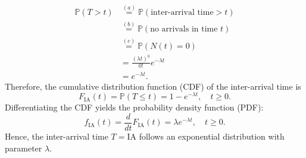 \documentclass[a4paper,12pt]{article}
\begin{document}
\begin{align*}
\mathbb{P}(T > t)
&\stackrel{(a)}{=} \mathbb{P}(\text{inter-arrival time} > t) \\
&\stackrel{(b)}{=} \mathbb{P}(\text{no arrivals in time } t) \\
&\stackrel{(c)}{=} \mathbb{P}(N(t) = 0) \\
&= \frac{(\lambda t)^0}{0!} e^{-\lambda t} \\
&= e^{-\lambda t}.
\end{align*}
\noindent
Therefore, the cumulative distribution function (CDF) of the inter-arrival time is
\[
F_{\text{IA}}(t) = \mathbb{P}(T \le t) = 1 - e^{-\lambda t}, \quad t \ge 0.
\]
\noindent
Differentiating the CDF yields the probability density function (PDF):
\[
f_{\text{IA}}(t) = \frac{d}{dt}F_{\text{IA}}(t) = \lambda e^{-\lambda t}, \quad t \ge 0.
\]
\noindent
Hence, the inter-arrival time $T = {\text{IA}}$ follows an exponential distribution with parameter $\lambda$.\\
\end{document}
